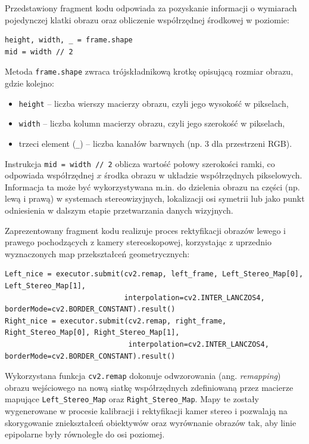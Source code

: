 \documentclass[magisterska]{pracadypl}
\begin{document}
Przedstawiony fragment kodu odpowiada za pozyskanie informacji o wymiarach pojedynczej klatki obrazu oraz obliczenie współrzędnej środkowej w poziomie:

\begin{lstlisting}[style=mypython]
height, width, _ = frame.shape
mid = width // 2
\end{lstlisting}

Metoda \texttt{frame.shape} zwraca trójskładnikową krotkę opisującą rozmiar obrazu, gdzie kolejno:  
\begin{itemize}
    \item \texttt{height} – liczba wierszy macierzy obrazu, czyli jego wysokość w pikselach,  
    \item \texttt{width} – liczba kolumn macierzy obrazu, czyli jego szerokość w pikselach,  
    \item trzeci element (\texttt{\_}) – liczba kanałów barwnych (np. 3 dla przestrzeni RGB).  
\end{itemize}

Instrukcja \texttt{mid = width // 2} oblicza wartość połowy szerokości ramki, co odpowiada współrzędnej $x$ środka obrazu w układzie współrzędnych pikselowych. Informacja ta może być wykorzystywana m.in. do dzielenia obrazu na części (np. lewą i prawą) w systemach stereowizyjnych, lokalizacji osi symetrii lub jako punkt odniesienia w dalszym etapie przetwarzania danych wizyjnych.  

Zaprezentowany fragment kodu realizuje proces rektyfikacji obrazów lewego i prawego pochodzących z kamery stereoskopowej, korzystając z uprzednio wyznaczonych map przekształceń geometrycznych:

\begin{lstlisting}[style=mypython]
Left_nice = executor.submit(cv2.remap, left_frame, Left_Stereo_Map[0], Left_Stereo_Map[1],
                            interpolation=cv2.INTER_LANCZOS4, borderMode=cv2.BORDER_CONSTANT).result()
Right_nice = executor.submit(cv2.remap, right_frame, Right_Stereo_Map[0], Right_Stereo_Map[1],
                             interpolation=cv2.INTER_LANCZOS4, borderMode=cv2.BORDER_CONSTANT).result()
\end{lstlisting}

Wykorzystana funkcja \texttt{cv2.remap} dokonuje odwzorowania (ang. \textit{remapping}) obrazu wejściowego na nową siatkę współrzędnych zdefiniowaną przez macierze mapujące \texttt{Left\_Stereo\_Map} oraz \texttt{Right\_Stereo\_Map}. Mapy te zostały wygenerowane w procesie kalibracji i rektyfikacji kamer stereo i pozwalają na skorygowanie zniekształceń obiektywów oraz wyrównanie obrazów tak, aby linie epipolarne były równoległe do osi poziomej.  
\end{document}
